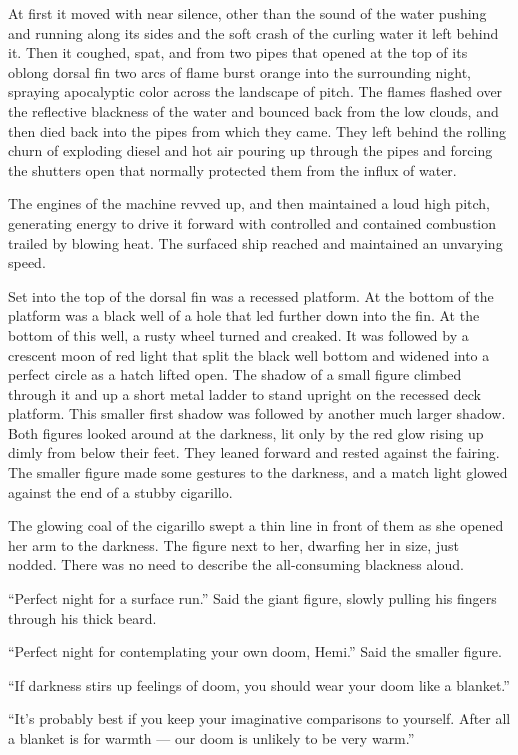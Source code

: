 \documentclass[
]{scrbook}
\begin{document}
At first it moved with near silence, other than the sound of the water
pushing and running along its sides and the soft crash of the curling
water it left behind it. Then it coughed, spat, and from two pipes that
opened at the top of its oblong dorsal fin two arcs of flame burst
orange into the surrounding night, spraying apocalyptic color across the
landscape of pitch. The flames flashed over the reflective blackness of
the water and bounced back from the low clouds, and then died back into
the pipes from which they came. They left behind the rolling churn of
exploding diesel and hot air pouring up through the pipes and forcing
the shutters open that normally protected them from the influx of water.

The engines of the machine revved up, and then maintained a loud high
pitch, generating energy to drive it forward with controlled and
contained combustion trailed by blowing heat. The surfaced ship reached
and maintained an unvarying speed.

Set into the top of the dorsal fin was a recessed platform. At the
bottom of the platform was a black well of a hole that led further down
into the fin. At the bottom of this well, a rusty wheel turned and
creaked. It was followed by a crescent moon of red light that split the
black well bottom and widened into a perfect circle as a hatch lifted
open. The shadow of a small figure climbed through it and up a short
metal ladder to stand upright on the recessed deck platform. This
smaller first shadow was followed by another much larger shadow. Both
figures looked around at the darkness, lit only by the red glow rising
up dimly from below their feet. They leaned forward and rested against
the fairing. The smaller figure made some gestures to the darkness, and
a match light glowed against the end of a stubby cigarillo.

The glowing coal of the cigarillo swept a thin line in front of them as
she opened her arm to the darkness. The figure next to her, dwarfing her
in size, just nodded. There was no need to describe the all-consuming
blackness aloud.

``Perfect night for a surface run.'' Said the giant figure, slowly
pulling his fingers through his thick beard.

``Perfect night for contemplating your own doom, Hemi.'' Said the
smaller figure.

``If darkness stirs up feelings of doom, you should wear your doom like
a blanket.''

``It's probably best if you keep your imaginative comparisons to
yourself. After all a blanket is for warmth --- our doom is unlikely to
be very warm.''
\end{document}

